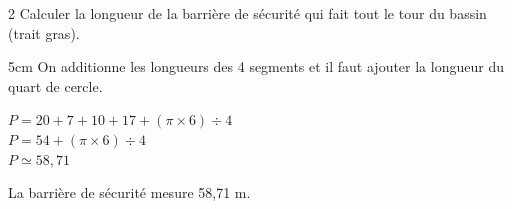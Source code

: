 \documentclass[a4paper]{book}
\begin{document}
{\begin{exerciceNote}{2}
        Calculer la longueur de la barrière de sécurité qui fait tout le tour du bassin (trait gras). 

        \begin{ZoneReponse}{5cm}
            On additionne les longueurs des 4 segments et il faut ajouter la longueur du quart de cercle.
            
            $P=20+7+10+17+(\pi\times6)\div4$\\
            $P=54+(\pi\times6)\div4$\\
            $P\simeq58,71$

            La barrière de sécurité mesure 58,71 m.
        \end{ZoneReponse}
    \end{exerciceNote}

}
\end{document}
